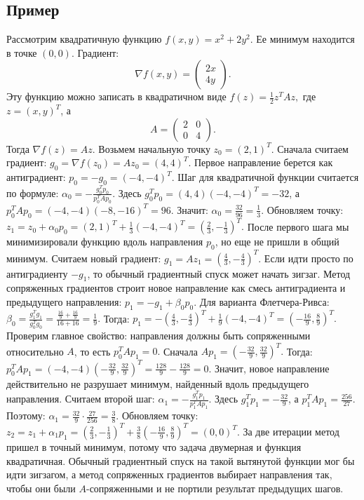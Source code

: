 \documentclass[12pt,a4paper]{article}
\begin{document}
\subsection{Пример}
Рассмотрим квадратичную функцию $f(x,y)=x^2+2y^2.$
Ее минимум находится в точке $(0,0).$
Градиент:
\[
\nabla f(x,y)=
\begin{pmatrix}
2x\\
4y
\end{pmatrix}.
\]
Эту функцию можно записать в квадратичном виде $f(z)=\frac12 z^TAz,$ где $z=(x,y)^T$, а
\[
A=
\begin{pmatrix}
2 & 0\\
0 & 4
\end{pmatrix}.
\]
Тогда $\nabla f(z)=Az.$ Возьмем начальную точку $z_0=(2,1)^T.$
Сначала считаем градиент:
$g_0=\nabla f(z_0)=Az_0=(4,4)^T.$
Первое направление берется как антиградиент:
$p_0=-g_0=(-4,-4)^T.$
Шаг для квадратичной функции считается по формуле:
$\alpha_0=-\frac{g_0^Tp_0}{p_0^TAp_0}.$
Здесь $g_0^Tp_0=(4,4)(-4,-4)^T=-32$, а $p_0^TAp_0=(-4,-4)(-8,-16)^T=96.$
Значит:
$\alpha_0=\frac{32}{96}=\frac13.$
Обновляем точку:
$z_1=z_0+\alpha_0p_0=(2,1)^T+\frac13(-4,-4)^T=\left(\frac23,-\frac13\right)^T.$
После первого шага мы минимизировали функцию вдоль направления $p_0$, но еще не пришли в общий минимум.
Считаем новый градиент:
$g_1=Az_1=\left(\frac43,-\frac43\right)^T.$
Если идти просто по антиградиенту $-g_1$, то обычный градиентный спуск может начать зигзаг. Метод сопряженных градиентов строит новое направление как смесь антиградиента и предыдущего направления:
$p_1=-g_1+\beta_0p_0.$
Для варианта Флетчера-Ривса:
$\beta_0=\frac{g_1^Tg_1}{g_0^Tg_0}=\frac{\frac{16}{9}+\frac{16}{9}}{16+16}=\frac19.$
Тогда:
$p_1=-\left(\frac43,-\frac43\right)^T+\frac19(-4,-4)^T=\left(-\frac{16}{9},\frac89\right)^T.$
Проверим главное свойство: направления должны быть сопряженными относительно $A$, то есть $p_0^TAp_1=0.$
Сначала $Ap_1=\left(-\frac{32}{9},\frac{32}{9}\right)^T.$
Тогда:
$p_0^TAp_1=(-4,-4)\left(-\frac{32}{9},\frac{32}{9}\right)^T=\frac{128}{9}-\frac{128}{9}=0.$
Значит, новое направление действительно не разрушает минимум, найденный вдоль предыдущего направления.
Считаем второй шаг:
$\alpha_1=-\frac{g_1^Tp_1}{p_1^TAp_1}.$
Здесь $g_1^Tp_1=-\frac{32}{9}$, а $p_1^TAp_1=\frac{256}{27}$.
Поэтому:
$\alpha_1=\frac{32}{9}\cdot\frac{27}{256}=\frac38.$
Обновляем точку:
$z_2=z_1+\alpha_1p_1=\left(\frac23,-\frac13\right)^T+\frac38\left(-\frac{16}{9},\frac89\right)^T=(0,0)^T.$
За две итерации метод пришел в точный минимум, потому что задача двумерная и функция квадратичная. Обычный градиентный спуск на такой вытянутой функции мог бы идти зигзагом, а метод сопряженных градиентов выбирает направления так, чтобы они были $A$-сопряженными и не портили результат предыдущих шагов.
\end{document}
